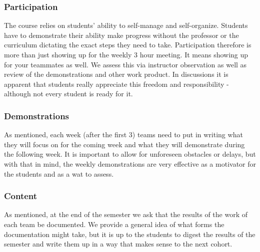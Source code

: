 \subsubsection{Participation}
The course relies on students' ability to self-manage and self-organize. Students have to demonstrate their ability make progress without the professor or the curriculum dictating the exact steps they need to take. Participation therefore is more than just showing up for the weekly 3 hour meeting. It means showing up for your teammates as well. We assess this via instructor observation as well as review of the demonstrations and other work product. In discussions it is apparent that students really appreciate this freedom and responsibility - although not every student is ready for it.

\subsubsection{Demonstrations}
As mentioned, each week (after the first 3) teams need to put in writing what they will focus on for the coming week and what they will demonstrate during the following week. It is important to allow for unforeseen obstacles or delays, but with that in mind, the weekly demonstrations are very effective as a motivator for the students and as a wat to assess.

\subsubsection{Content}As mentioned, at the end of the semester we ask that the results of the work of each team be documented. We provide a general idea of what forms the documentation might take, but it is up to the students to digest the results of the semester and write them up in a way that makes sense to the next cohort.

